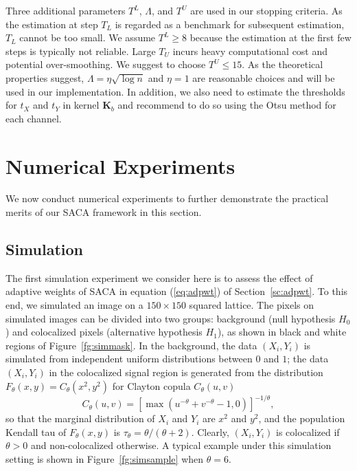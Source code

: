 \documentclass[10pt,twocolumn,twoside]{IEEEtran}
\def\bK{\mathbf K}
\begin{document}
Three additional parameters $T^L$, $\Lambda$, and $T^U$ are used in our stopping criteria. As the estimation at step $T_L$ is regarded as a benchmark for subsequent estimation, $T_L$ cannot be too small. We assume $T^L\ge 8$ because the estimation at the first few steps is typically not reliable. Large $T_U$ incurs heavy computational cost and potential over-smoothing. We suggest to choose $T^U\le 15$. As the theoretical properties suggest, $\Lambda=\eta\sqrt{\log n}$ and $\eta=1$ are reasonable choices and will be used in our implementation. In addition, we also need to estimate the thresholds for $t_X$ and $t_Y$ in kernel $\bK_b$ and recommend to do so using the Otsu method \citep[see][]{sezgin2004} for each channel. 

\section{Numerical Experiments}
\label{sc:numerical}

We now conduct numerical experiments to further demonstrate the practical merits of our SACA framework in this section.

\subsection{Simulation}

The first simulation experiment we consider here is to assess the effect of adaptive weights of SACA in equation (\ref{eq:adpwt}) of Section~\ref{sc:adpwt}. To this end, we simulated an image on a $150\times 150$ squared lattice. The pixels on simulated images can be divided into two groups: background (null hypothesis $H_0$) and colocalized pixels (alternative hypothesis $H_1$), as shown in black and white regions of Figure~\ref{fg:simmask}. In the background, the data $(X_i,Y_i)$ is simulated from independent uniform distributions between $0$ and $1$; the data $(X_i,Y_i)$ in the colocalized signal region is generated from the distribution $F_\theta(x,y)=C_\theta(x^2,y^2)$ for Clayton copula $C_\theta(u,v)$ \citep[see][]{nelsen2006}
$$
C_\theta(u,v)=\left[\max\left(u^{-\theta}+v^{-\theta}-1,0\right)\right]^{-1/\theta},
$$
so that the marginal distribution of $X_i$ and $Y_i$ are $x^2$ and $y^2$, and the population Kendall tau of $F_\theta(x,y)$ is $\tau_\theta=\theta/(\theta+2)$. Clearly, $(X_i,Y_i)$ is colocalized if $\theta>0$ and non-colocalized otherwise. A typical example under this simulation setting is shown in Figure~\ref{fg:simsample} when $\theta=6$. 
\end{document}
